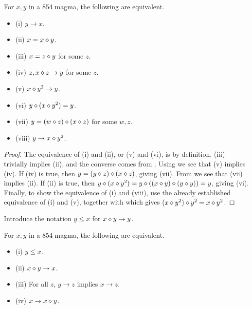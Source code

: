 \begin{lemma}[854 equivalences, I]\label{854-equiv}  For $x, y$ in a 854 magma, the following are equivalent.
  \begin{itemize}
  \item (i) $y \to x$.
  \item (ii) $x = x \diamond y$.
  \item (iii) $x = z \diamond y$ for some $z$.
  \item (iv) $z, x \diamond z \to y$ for some $z$.
  \item (v) $x \diamond y^2 \to y$.
  \item (vi) $y \diamond (x \diamond y^2) = y$.
  \item (vii) $y = (w \diamond z) \diamond (x \diamond z)$ for some $w,z$.
  \item (viii) $y \to x \diamond y^2$.
  \end{itemize}
\end{lemma}

\begin{proof} The equivalence of (i) and (ii), or (v) and (vi), is by definition.  (iii) trivially implies (ii), and the converse comes from .  Using  we see that (v) implies (iv).  If (iv) is true, then $y = (y \diamond z) \diamond (x \diamond z)$, giving (vii).  From  we see that (vii) implies (ii).  If (ii) is true, then $y \diamond (x \diamond y^2) = y \diamond ((x \diamond y) \diamond (y \diamond y)) = y$, giving (vi).  Finally, to show the equivalence of (i) and (viii), use the already established equivalence of (i) and (v), together with  which gives $(x \diamond y^2) \diamond y^2 = x \diamond y^2$.
\end{proof}

Introduce the notation $y \leq x$ for $x \diamond y \to y$.

\begin{lemma}[854 equivalences, II]\label{854-equiv-2}  For $x,y$ in a 854 magma, the following are equivalent.
  \begin{itemize}
  \item (i) $y \leq x$.
  \item (ii) $x \diamond y \to x$.
  \item (iii)  For all $z$, $y \to z$ implies $x \to z$.
  \item (iv) $x \to x \diamond y$.
  \end{itemize}
\end{lemma}

